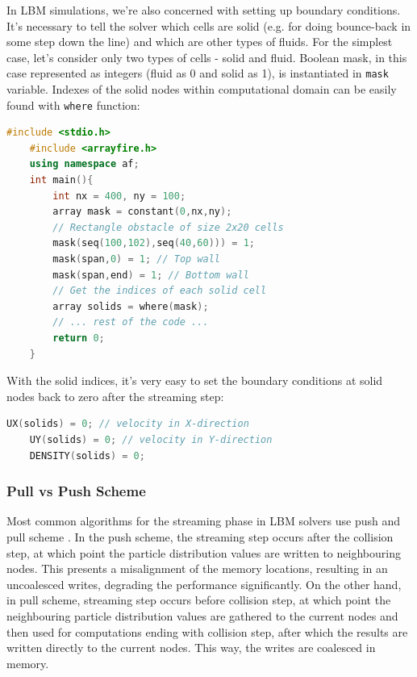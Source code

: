 In LBM simulations, we're also concerned with setting up boundary conditions. It's necessary to tell the solver which cells are solid (e.g. for doing bounce-back in some step down the line) and which are other types of fluids. For the simplest case, let's consider only two types of cells - solid and fluid. Boolean mask, in this case represented as integers (fluid as 0 and solid as 1), is instantiated in \texttt{mask} variable. Indexes of the solid nodes within computational domain can be easily found with \texttt{where} function:

\begin{lstlisting}[language=Cpp, caption=C++ code for constructiong the index of all solid cells using ArrayFire.]
	#include <stdio.h>
	#include <arrayfire.h>
	using namespace af;
	int main(){
		int nx = 400, ny = 100;
		array mask = constant(0,nx,ny);
		// Rectangle obstacle of size 2x20 cells
		mask(seq(100,102),seq(40,60))) = 1;
		mask(span,0) = 1; // Top wall
		mask(span,end) = 1; // Bottom wall
		// Get the indices of each solid cell
		array solids = where(mask);
		// ... rest of the code ...
		return 0;
	}
\end{lstlisting}

With the solid indices, it's very easy to set the boundary conditions at solid nodes back to zero after the streaming step:

\begin{lstlisting}[language=Cpp, caption=Boundary conditions at solid nodes.]
	UX(solids) = 0; // velocity in X-direction
	UY(solids) = 0; // velocity in Y-direction
	DENSITY(solids) = 0;
\end{lstlisting}

\subsubsection{Pull vs Push Scheme}

Most common algorithms for the streaming phase in LBM solvers use push and pull scheme \cite{tranPerformanceOptimization3D2017, herschlagGPUDataAccess2018}. In the push scheme, the streaming step occurs after the collision step, at which point the particle distribution values are written to neighbouring nodes. This presents a misalignment of the memory locations, resulting in an uncoalesced writes, degrading the performance significantly. On the other hand, in pull scheme, streaming step occurs before collision step, at which point the neighbouring particle distribution values are gathered to the current nodes and then used for computations ending with collision step, after which the results are written directly to the current nodes. This way, the writes are coalesced in memory.

